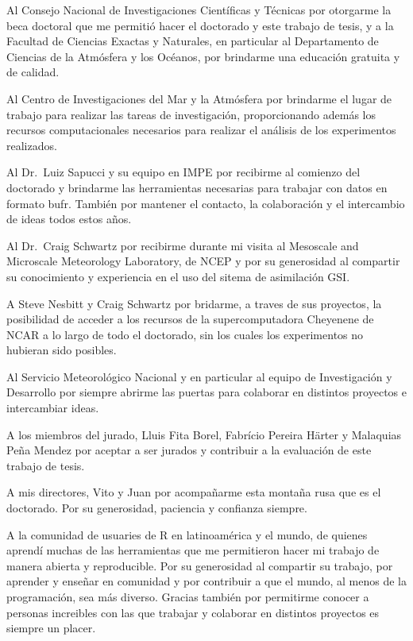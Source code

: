 \documentclass[12pt,oneside,a4paper]{reedthesis}
\begin{document}
  \begin{acknowledgements}
    Al Consejo Nacional de Investigaciones Científicas y Técnicas por otorgarme la beca doctoral que me permitió hacer el doctorado y este trabajo de tesis, y a la Facultad de Ciencias Exactas y Naturales, en particular al Departamento de Ciencias de la Atmósfera y los Océanos, por brindarme una educación gratuita y de calidad.
    
    Al Centro de Investigaciones del Mar y la Atmósfera por brindarme el lugar de trabajo para realizar las tareas de investigación, proporcionando además los recursos computacionales necesarios para realizar el análisis de los experimentos realizados.
    
    Al Dr.~Luiz Sapucci y su equipo en IMPE por recibirme al comienzo del doctorado y brindarme las herramientas necesarias para trabajar con datos en formato bufr. También por mantener el contacto, la colaboración y el intercambio de ideas todos estos años.
    
    Al Dr.~Craig Schwartz por recibirme durante mi visita al Mesoscale and Microscale Meteorology Laboratory, de NCEP y por su generosidad al compartir su conocimiento y experiencia en el uso del sitema de asimilación GSI.
    
    A Steve Nesbitt y Craig Schwartz por bridarme, a traves de sus proyectos, la posibilidad de acceder a los recursos de la supercomputadora Cheyenene de NCAR a lo largo de todo el doctorado, sin los cuales los experimentos no hubieran sido posibles.
    
    Al Servicio Meteorológico Nacional y en particular al equipo de Investigación y Desarrollo por siempre abrirme las puertas para colaborar en distintos proyectos e intercambiar ideas.
    
    A los miembros del jurado, Lluis Fita Borel, Fabrício Pereira Härter y Malaquias Peña Mendez por aceptar a ser jurados y contribuir a la evaluación de este trabajo de tesis.
    
    A mis directores, Vito y Juan por acompañarme esta montaña rusa que es el doctorado. Por su generosidad, paciencia y confianza siempre.
    
    A la comunidad de usuaries de R en latinoamérica y el mundo, de quienes aprendí muchas de las herramientas que me permitieron hacer mi trabajo de manera abierta y reproducible. Por su generosidad al compartir su trabajo, por aprender y enseñar en comunidad y por contribuir a que el mundo, al menos de la programación, sea más diverso. Gracias también por permitirme conocer a personas increibles con las que trabajar y colaborar en distintos proyectos es siempre un placer.
    

\end{acknowledgements}
\end{document}
